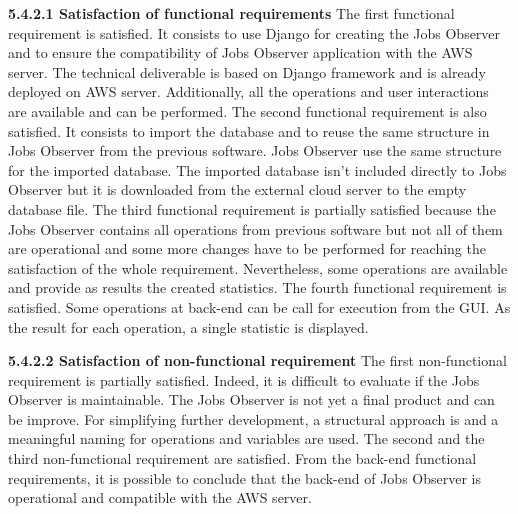 \documentclass[conference,compsoc]{IEEEtran}
\begin{document}
\noindent
\newline\newline
\textbf{5.4.2.1 Satisfaction of functional requirements}
\newline\newline
The first functional requirement is satisfied. It consists to use Django for creating the Jobs Observer and to ensure the compatibility of Jobs Observer application with the AWS server. The technical deliverable is based on Django framework and is already deployed on AWS server. Additionally, all the operations and user interactions are available and can be performed. 
\newline
The second functional requirement is also satisfied. It consists to import the database and to reuse the same structure in Jobs Observer from the previous software.  Jobs Observer use the same structure for the imported database. The imported database isn't included directly to Jobs Observer but it is downloaded from the external cloud server to the empty database file. 
\newline
The third functional requirement is partially satisfied because the Jobs Observer contains all operations from previous software but not all of them are operational and some more changes have to be performed for reaching the satisfaction of the whole requirement. Nevertheless, some operations are available and provide as results the created statistics. 
\newline
The fourth functional requirement is satisfied. Some operations at back-end can be call for execution from the GUI. As the result for each operation, a single statistic is displayed. 

\noindent
\newline\newline
\textbf{5.4.2.2 Satisfaction of non-functional requirement}
\newline\newline
The first non-functional requirement is partially satisfied. Indeed, it is difficult to evaluate if the Jobs Observer is maintainable. The Jobs Observer is not yet a final product and can be improve. For simplifying further development, a structural approach is and a meaningful naming for operations and variables are used. 
\newline
The second and the third non-functional requirement are satisfied. From the back-end functional requirements, it is possible to conclude that the back-end of Jobs Observer is operational and compatible with the AWS server. 
\end{document}

